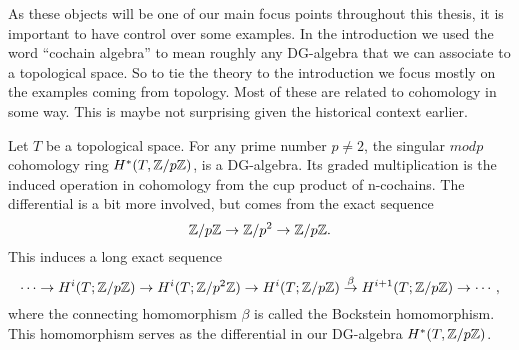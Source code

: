 

As these objects will be one of our main focus points throughout this thesis, it is important to have control over some examples. In the introduction we used the word ``cochain algebra'' to mean roughly any DG-algebra that we can associate to a topological space. So to tie the theory to the introduction we focus mostly on the examples coming from topology. Most of these are related to cohomology in some way. This is maybe not surprising given the historical context earlier. 

\begin{example}
\label{ex:singular_p_cohomology}
Let $T$ be a topological space. For any prime number $p\neq 2$, the singular $mod p$ cohomology ring $H^*(T, \mathbb{Z}/p\mathbb{Z})$, is a DG-algebra. Its graded multiplication is the induced operation in cohomology from the cup product of n-cochains. The differential is a bit more involved, but comes from the exact sequence
\begin{equation*}
\mathbb{Z}/p\mathbb{Z} \rightarrow \mathbb{Z}/p^2 \rightarrow \mathbb{Z}/p\mathbb{Z}.
\end{equation*}    
This induces a long exact sequence 
\begin{equation*}
    \cdots \rightarrow H^i(T; \mathbb{Z}/p\mathbb{Z}) \rightarrow H^i(T; \mathbb{Z}/p^2\mathbb{Z}) \rightarrow H^i(T; \mathbb{Z}/p\mathbb{Z}) \overset{\beta}\rightarrow H^{i+1}(T; \mathbb{Z}/p\mathbb{Z}) \rightarrow \cdots, 
\end{equation*}
where the connecting homomorphism $\beta$ is called the Bockstein homomorphism. This homomorphism serves as the differential in our DG-algebra $H^*(T, \mathbb{Z}/p\mathbb{Z})$. 
\end{example}

